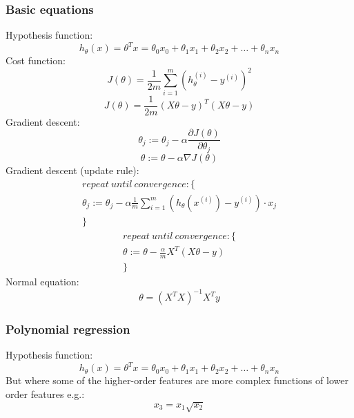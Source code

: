 \documentclass[12pt]{article}
\begin{document}
\subsubsection{Basic equations}
Hypothesis function:
\begin{equation}
h_{\theta}(x)=\theta^{T}x=\theta_{0}x_0 + \theta_{1}x_1 + \theta_{2}x_2 + \dots + \theta_{n}x_n
\end{equation}
Cost function:
\begin{equation}
J(\theta)=\frac{1}{2m}\sum_{i=1}^{m}(h_{\theta}^{(i)}-y^{(i)})^{2}
\end{equation}
\begin{equation}
J(\theta)=\frac{1}{2m}(X\theta-y)^{T}(X\theta-y)
\end{equation}
Gradient descent:
\begin{equation}
\theta_j:=\theta_j-\alpha\frac{\partial J(\theta)}{\partial\theta_j}
\end{equation}
\begin{equation}
\theta:=\theta-\alpha\nabla J(\theta)
\end{equation}
Gradient descent (update rule):
\begin{multline}
repeat\:until\:convergence: \{\\
\theta_j:=\theta_{j}-\alpha\frac{1}{m}\sum_{i=1}^{m}(h_{\theta}(x^{(i)})-y^{(i)})\cdot x_j\\
\}
\end{multline}
\begin{multline}
repeat\:until\:convergence: \{\\
\theta:=\theta-\frac{\alpha}{m}X^{T}(X\theta-y)\\
\}
\end{multline}
Normal equation:
\begin{equation}
\theta=(X^{T}X)^{-1}X^{T}y
\end{equation}
\subsubsection{Polynomial regression}
Hypothesis function:
\begin{equation}
h_{\theta}(x)=\theta^{T}x=\theta_{0}x_0 + \theta_{1}x_1 + \theta_{2}x_2 + \dots + \theta_{n}x_n
\end{equation}
But where some of the higher-order features are more complex functions of lower order features e.g.:
\begin{equation}
x_3=x_1\sqrt{x_2}
\end{equation}
\end{document}
